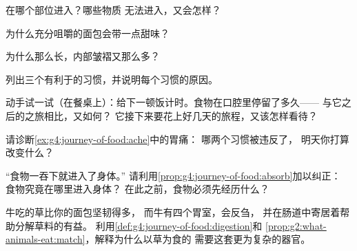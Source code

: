 \begin{exercise}[$\star$]\label{exo:g4:journey-of-food:4}
在哪个部位进入？哪些物质
无法进入，又会怎样？
\end{exercise}

\begin{exercise}[$\star$]\label{exo:g4:journey-of-food:5}
为什么充分咀嚼的面包会带一点甜味？
\end{exercise}

\begin{exercise}[$\star$]\label{exo:g4:journey-of-food:6}
为什么那么长，内部皱褶又那么多？
\end{exercise}

\begin{exercise}[$\star$]\label{exo:g4:journey-of-food:7}
列出三个有利于的习惯，并说明每个习惯的原因。
\end{exercise}

\begin{exercise}[$\star$]\label{exo:g4:journey-of-food:8}
动手试一试（在餐桌上）：给下一顿饭计时。食物在口腔里停留了多久——
与它之后的之旅相比，又如何？
它接下来要花上好几天的旅程，又该怎样看待？
\end{exercise}

\begin{exercise}[$\star\star$]\label{exo:g4:journey-of-food:9}
请诊断\cref{ex:g4:journey-of-food:ache}中的胃痛：
哪两个习惯被违反了，
明天你打算改变什么？
\end{exercise}

\begin{exercise}[$\star\star$]\label{exo:g4:journey-of-food:10}
“食物一吞下就进入了身体。”
请利用\cref{prop:g4:journey-of-food:absorb}加以纠正：
食物究竟在哪里进入身体？
在此之前，食物必须先经历什么？
\end{exercise}

\begin{exercise}[$\star\star\star$]\label{exo:g4:journey-of-food:11}
牛吃的草比你的面包坚韧得多，
而牛有四个胃室，会反刍，
并在肠道中寄居着帮助分解草料的有益。
利用\cref{def:g4:journey-of-food:digestion}和
\cref{prop:g2:what-animals-eat:match}，解释为什么以草为食的
需要这套更为复杂的器官。
\end{exercise}
